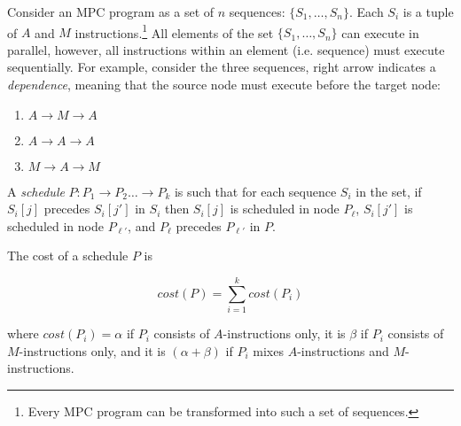

Consider an MPC program as a set of $n$ sequences: $\{S_1, \dots, S_n\}$. Each $S_i$ is a tuple of $A$ and $M$ instructions.\footnote{Every MPC program can be transformed into such a set of sequences.} All elements of the set $\{S_1, \dots, S_n\}$ can execute in parallel, however, all instructions within an element (i.e. sequence) must execute sequentially. For example, consider the three sequences, right arrow indicates a \emph{dependence}, meaning that the source node must execute before the target node: 

\begin{enumerate}
    \item $A \rightarrow M \rightarrow A$
    \item $A \rightarrow A \rightarrow A$
    \item $M \rightarrow A \rightarrow M$
\end{enumerate} 

A \emph{schedule} $P: P_1 \rightarrow P_2 \dots \rightarrow P_k$ is such that for each sequence $S_i$ in the set, if $S_i[j]$ precedes $S_i[j']$ in $S_i$ then $S_i[j]$ is scheduled in node $P_\ell$, $S_i[j']$ is scheduled in node $P_{\ell'}$, and $P_\ell$ precedes $P_{\ell'}$ in $P$. 

The cost of a schedule $P$ is 

\begin{equation}
    \mathit{cost}(P) = \sum_{i=1}^k \mathit{cost}(P_i)
\end{equation}

where $\mathit{cost}(P_i) = \alpha$ if $P_i$ consists of $A$-instructions only, it is $\beta$ if $P_i$ consists of $M$-instructions only, and it is $(\alpha + \beta)$ if $P_i$ mixes $A$-instructions and $M$-instructions. 

